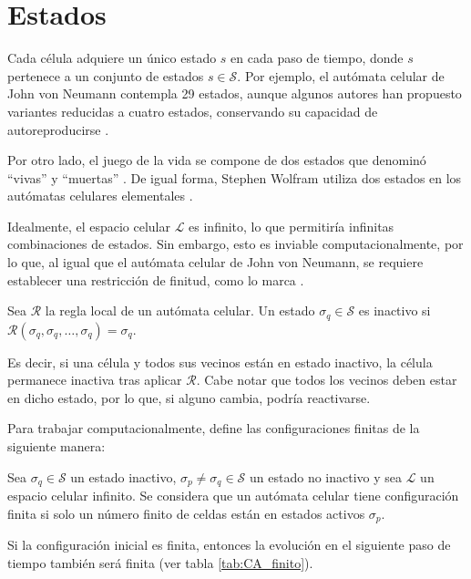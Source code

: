 \section{Estados}

Cada célula adquiere un único estado $s$ en cada paso de tiempo, donde $s$ pertenece a un conjunto de estados $s \in \mathcal{S}$. Por ejemplo, el autómata celular de John von Neumann contempla 29 estados, aunque algunos autores han propuesto variantes reducidas a cuatro estados, conservando su capacidad de autoreproducirse \cite{ca_phd}. 

Por otro lado, el juego de la vida se compone de dos estados que denominó ``vivas'' y ``muertas'' \cite{life}.  De igual forma, Stephen Wolfram utiliza dos estados en los autómatas celulares elementales \cite{nks}.

Idealmente, el espacio celular $\mathcal{L}$ es infinito, lo que permitiría infinitas combinaciones de estados. Sin embargo, esto es inviable computacionalmente, por lo que, al igual que el autómata celular de John von Neumann, se requiere establecer una restricción de finitud, como lo marca \cite{ca_phd}. 

\begin{definition}
	
	Sea $\mathcal{R}$ la regla local de un autómata celular. Un estado $\sigma_q \in \mathcal{S}$ es inactivo si $\mathcal{R}(\sigma_q, \sigma_q, \dots, \sigma_q) = \sigma_q$.
	
\end{definition}

Es decir, si una célula y todos sus vecinos están en estado inactivo, la célula permanece inactiva tras aplicar $\mathcal{R}$. Cabe notar que todos los vecinos deben estar en dicho estado, por lo que, si alguno cambia, podría reactivarse. 

Para trabajar computacionalmente, \cite{ca_phd} define las configuraciones finitas de la siguiente manera:

\begin{definition}
	
	Sea $\sigma_q \in \mathcal{S}$ un estado inactivo, $\sigma_p \neq \sigma_q \in \mathcal{S}$ un estado no inactivo y sea $\mathcal{L}$ un espacio celular infinito. Se considera que un autómata celular tiene configuración finita si solo un número finito de celdas están en estados activos $\sigma_p$.
	
\end{definition}

Si la configuración inicial es finita, entonces la evolución en el siguiente paso de tiempo también será finita (ver tabla \ref{tab:CA_finito}).

